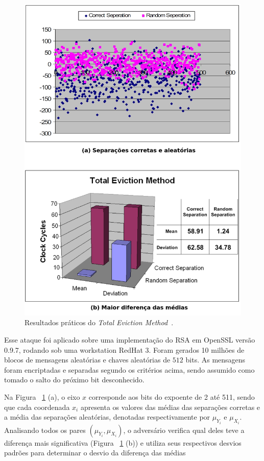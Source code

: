 \documentclass{SBCbookchapter}
\begin{document}
\begin{figure}[ht]
	\centering
	\includegraphics[width=.7\textwidth]{figures/totaleviction.jpg}
	\caption{Resultados pr\'{a}ticos do \textit{Total Eviction Method}~\cite{Jean-Pierre06predictingsecret}.}
	\label{fig:Fig_totaleviction}
\end{figure}

Esse ataque foi aplicado sobre uma implementa\c{c}\~{a}o do RSA em OpenSSL vers\~{a}o 0.9.7, rodando sob uma workstation RedHat 3. Foram gerados 10 milh\~{o}es de blocos de mensagens aleat\'{o}rias e chaves aleat\'{o}rias de $512$ bits. As mensagens foram encriptadas e separadas segundo os crit\'{e}rios acima, sendo assumido como tomado o salto do pr\'{o}ximo bit desconhecido.
       
Na Figura ~\ref{fig:Fig_totaleviction} (a), o eixo $x$ corresponde aos bits do expoente de 2 at\'{e} 511, sendo que cada coordenada $x_{i}$ apresenta os valores das m\'{e}dias das separa\c{c}\~{o}es corretas e a m\'{e}dia das separa\c{c}\~{o}es aleat\'{o}rias, denotadas respectivamente por $\mu_{Y_{i}}$ e $\mu_{X_{i}}$. Analisando todos os pares $(\mu_{Y_{i}}, \mu_{X_{i}})$, o advers\'{a}rio verifica  qual deles teve a diferen\c{c}a mais significativa (Figura ~\ref{fig:Fig_totaleviction} (b)) e utiliza seus respectivos desvios padr\~{o}es para determinar o desvio da diferen\c{c}a das m\'{e}dias
\end{document}
